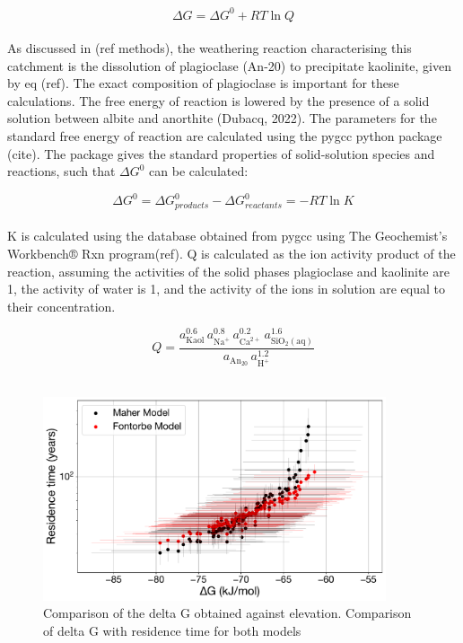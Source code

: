 \begin{equation}
    \Delta G = \Delta G^0 + RT \ln Q
\end{equation}\\

As discussed in  (ref methods), the weathering reaction characterising this catchment is the dissolution of plagioclase (An-20) to precipitate kaolinite, given by eq (ref). The exact composition of plagioclase is important for these calculations. The free energy of reaction is lowered by the presence of a solid solution between albite and anorthite (Dubacq, 2022). The parameters for the standard free energy of reaction are calculated using the pygcc python package (cite). The package gives the standard properties of solid-solution species and reactions, such that $\Delta G^0$ can be calculated:

\begin{equation}
    \Delta G^0 = \Delta G^0_{products} - \Delta G^0_{reactants} = -RT \ln K
\end{equation}\\

K is calculated using the database obtained from pygcc using The Geochemist's Workbench® Rxn program(ref). Q is calculated as the ion activity product of the reaction, assuming the activities of the solid phases plagioclase and kaolinite are 1, the activity of water is 1, and the activity of the ions in solution are equal to their concentration.

\begin{equation}
    Q = \frac{a_{\mathrm{Kaol}}^{0.6}\,a_{\mathrm{Na}^{+}}^{0.8}\,a_{\mathrm{Ca}^{2+}}^{0.2}\,a_{\mathrm{SiO_{2}(aq)}}^{1.6}}
           {a_{\mathrm{An_{20}}}\,a_{\mathrm{H}^{+}}^{1.2}}
\end{equation}\\


\begin{figure}[H]
    \centering
    \includegraphics[width=0.9\textwidth]{delta_G_R_Si_time_Maher_vs_Fontorbe_Overlaid.pdf}
    \caption{Comparison of the delta G obtained against elevation. Comparison of delta G with residence time for both models}
    \label{fig:discussion11}
\end{figure}

